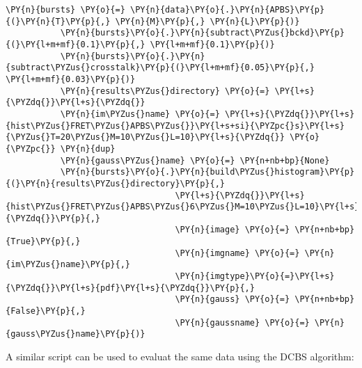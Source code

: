 \begin{Verbatim}[commandchars=\\\{\}, fontsize=\scriptsize]
           \PY{n}{bursts} \PY{o}{=} \PY{n}{data}\PY{o}{.}\PY{n}{APBS}\PY{p}{(}\PY{n}{T}\PY{p}{,} \PY{n}{M}\PY{p}{,} \PY{n}{L}\PY{p}{)}
           \PY{n}{bursts}\PY{o}{.}\PY{n}{subtract\PYZus{}bckd}\PY{p}{(}\PY{l+m+mf}{0.1}\PY{p}{,} \PY{l+m+mf}{0.1}\PY{p}{)}
           \PY{n}{bursts}\PY{o}{.}\PY{n}{subtract\PYZus{}crosstalk}\PY{p}{(}\PY{l+m+mf}{0.05}\PY{p}{,} \PY{l+m+mf}{0.03}\PY{p}{)}
           \PY{n}{results\PYZus{}directory} \PY{o}{=} \PY{l+s}{\PYZdq{}}\PY{l+s}{\PYZdq{}}
           \PY{n}{im\PYZus{}name} \PY{o}{=} \PY{l+s}{\PYZdq{}}\PY{l+s}{hist\PYZus{}FRET\PYZus{}APBS\PYZus{}}\PY{l+s+si}{\PYZpc{}s}\PY{l+s}{\PYZus{}T=20\PYZus{}M=10\PYZus{}L=10}\PY{l+s}{\PYZdq{}} \PY{o}{\PYZpc{}} \PY{n}{dup}
           \PY{n}{gauss\PYZus{}name} \PY{o}{=} \PY{n+nb+bp}{None}
           \PY{n}{bursts}\PY{o}{.}\PY{n}{build\PYZus{}histogram}\PY{p}{(}\PY{n}{results\PYZus{}directory}\PY{p}{,} 
                                  \PY{l+s}{\PYZdq{}}\PY{l+s}{hist\PYZus{}FRET\PYZus{}APBS\PYZus{}6\PYZus{}M=10\PYZus{}L=10}\PY{l+s}{\PYZdq{}}\PY{p}{,} 
                                  \PY{n}{image} \PY{o}{=} \PY{n+nb+bp}{True}\PY{p}{,} 
                                  \PY{n}{imgname} \PY{o}{=} \PY{n}{im\PYZus{}name}\PY{p}{,} 
                                  \PY{n}{imgtype}\PY{o}{=}\PY{l+s}{\PYZdq{}}\PY{l+s}{pdf}\PY{l+s}{\PYZdq{}}\PY{p}{,} 
                                  \PY{n}{gauss} \PY{o}{=} \PY{n+nb+bp}{False}\PY{p}{,} 
                                  \PY{n}{gaussname} \PY{o}{=} \PY{n}{gauss\PYZus{}name}\PY{p}{)}
\end{Verbatim}

A similar script can be used to evaluat the same data using the DCBS algorithm:

